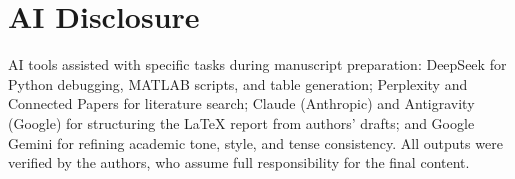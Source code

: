 \section*{AI Disclosure}
AI tools assisted with specific tasks during manuscript preparation: DeepSeek for Python debugging, MATLAB scripts, and table generation; Perplexity and Connected Papers for literature search; Claude (Anthropic) and Antigravity (Google) for structuring the \LaTeX{} report from authors' drafts; and Google Gemini for refining academic tone, style, and tense consistency. All outputs were verified by the authors, who assume full responsibility for the final content.